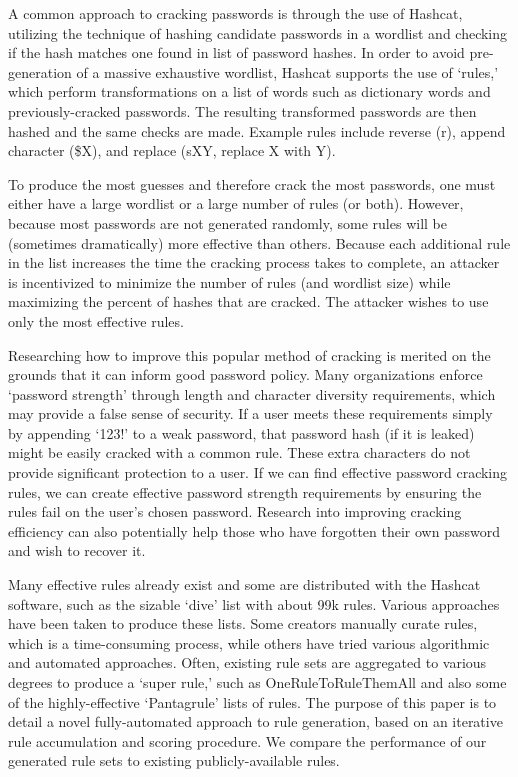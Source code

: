 \documentclass[letterpaper,twocolumn,10pt]{article}
\begin{document}
A common approach to cracking passwords is through the use of
Hashcat\cite{hashcat}, utilizing the technique of hashing candidate passwords
in a wordlist and checking if the hash matches one found in list of password
hashes. In order to avoid pre-generation of a massive exhaustive wordlist,
Hashcat supports the use of `rules,' which perform transformations on a list of
words such as dictionary words and previously-cracked passwords. The resulting
transformed passwords are then hashed and the same checks are made. Example
rules include reverse (r), append character (\$X), and replace (sXY, replace X
with Y).


To produce the most guesses and therefore crack the most passwords, one must
either have a large wordlist or a large number of rules (or both). However,
because most passwords are not generated randomly, some rules will be
(sometimes dramatically) more effective than others. Because each additional
rule in the list increases the time the cracking process takes to complete, an
attacker is incentivized to minimize the number of rules (and wordlist size)
while maximizing the percent of hashes that are cracked. The attacker wishes to
use only the most effective rules.

Researching how to improve this popular method of cracking
is merited on the grounds that it can inform good password policy.
Many organizations enforce `password strength' through
length and character diversity requirements, which may provide a false sense
of security. If a user meets these requirements simply by appending `123!' to a
weak password, that password hash (if it is leaked) might be easily cracked with
a common rule. These extra characters do not provide significant protection to
a user.
If we can find effective password cracking rules, we can create effective
password
strength requirements by ensuring the rules fail on the user's chosen password.
Research into improving cracking efficiency can also potentially help those
who have forgotten their own password and wish to recover it.


Many effective rules already exist and some are distributed with the Hashcat
software, such as the sizable `dive' list with about 99k rules. Various
approaches have been taken to produce these lists. Some creators manually
curate rules, which is a time-consuming process, while others have tried
various algorithmic and automated approaches. Often, existing rule sets are
aggregated to various degrees to produce a `super rule,' such as
OneRuleToRuleThemAll\cite{ortrta} and also some of the highly-effective
`Pantagrule' lists of rules\cite{pantagrule}. The purpose of this paper
is to detail a novel fully-automated approach to rule generation, based on an
iterative rule accumulation and scoring procedure. We compare the performance of
our generated rule sets to existing publicly-available rules.
\end{document}
